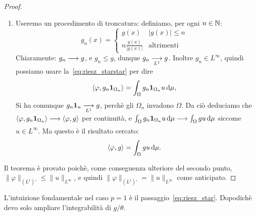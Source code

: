 \begin{proof}
\begin{enumerate}
		\item Useremo un procedimento di troncatura: definiamo, per ogni $n \in \N$:
		\begin{equation*}
			g_n(x) = \begin{cases}
				g(x) & |g(x)| \leq n\\
				n \frac{g(x)}{|g(x)|} & \text{altrimenti}
			\end{cases}
		\end{equation*}
		Chiaramente: $g_n \conv g$, e $g_n \leq g$, dunque $g_n \conv[L^1] g$. Inoltre $g_n \in L^\infty$, quindi possiamo usare la~\eqref{eq:riesz_starstar} per dire
		\begin{equation*}
			\langle \varphi, g_n \ind_{\Omega_n} \rangle = \int_\Omega g_n \ind_{\Omega_n} u \,\de\mu,
		\end{equation*}
		Si ha comunque $g_n \ind_n \conv[L^1] g$, perchè gli $\Omega_n$ invadono $\Omega$.
		Da ciò deduciamo che $\langle \varphi, g_n \ind_{\Omega_n} \rangle \conv \langle \varphi, g \rangle$ per continuità, e $\int_\Omega  g_n \ind_{\Omega_n} u \,\de\mu \conv \int_\Omega g u \,\de\mu$ siccome $u \in L^\infty$. Ma questo è il risultato cercato:
		\begin{equation*}
			\langle \varphi, g \rangle = \int_\Omega gu\,\de\mu.
		\end{equation*}
	\end{enumerate}
	Il teorema è provato poichè, come conseguenza ulteriore del secondo punto, $\|\varphi\|_{(L^1)'} \leq \|u\|_{L^\infty}$, e quindi $\|\varphi\|_{(L^1)'}=\|u\|_{L^\infty}$ come anticipato.
\end{proof}

\begin{remark}
	L'intuizione fondamentale nel caso $p=1$ è il passaggio~\eqref{eq:riesz_star}. Dopodichè devo solo ampliare l'integrabilità di $g/\theta$.
\end{remark}

